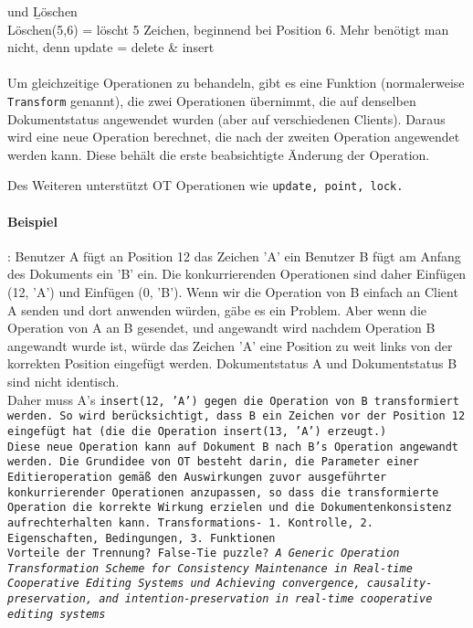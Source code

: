       und \b{Löschen}\\
      Löschen(5,6) = löscht 5 Zeichen, beginnend bei Position 6.
      Mehr benötigt man nicht, denn update = delete \& insert\\\\
      Um gleichzeitige Operationen zu behandeln, gibt es eine Funktion (normalerweise \texttt{Transform} genannt), die zwei Operationen übernimmt, die auf denselben Dokumentstatus angewendet wurden (aber auf verschiedenen Clients).
      Daraus wird eine neue Operation berechnet, die nach der zweiten Operation angewendet werden kann. Diese behält die erste beabsichtigte Änderung der Operation.

      Des Weiteren unterstützt \gls{OT} Operationen wie \tt{update}, \tt{point}, \tt{lock}.
      \paragraph{Beispiel}:
      Benutzer A fügt an Position 12 das Zeichen 'A' ein
      Benutzer B fügt am Anfang des Dokuments ein 'B' ein.
      Die konkurrierenden Operationen sind daher Einfügen (12, 'A') und Einfügen (0, 'B').
      Wenn wir die Operation von B einfach an Client A senden und dort anwenden würden, gäbe es ein Problem.
      Aber wenn die Operation von A an B gesendet, und angewandt wird nachdem Operation B angewandt wurde ist, würde das Zeichen 'A' eine Position zu weit links von der korrekten Position eingefügt werden.
      Dokumentstatus A und Dokumentstatus B sind nicht identisch.\\
      Daher muss A's \tt{insert(12, 'A')} gegen die Operation von B transformiert werden. So wird berücksichtigt, dass B ein Zeichen vor der Position 12 eingefügt hat (die die Operation \tt{insert(13, 'A')} erzeugt.)\\
      Diese neue Operation kann auf Dokument B nach B's Operation angewandt werden.
      Die Grundidee von \gls{OT} besteht darin, die Parameter einer Editieroperation gemäß den Auswirkungen \b{zuvor ausgeführter} konkurrierender Operationen anzupassen, so dass die transformierte Operation die korrekte Wirkung erzielen und die Dokumentenkonsistenz aufrechterhalten kann.
      Transformations- 1. Kontrolle, 2. Eigenschaften, Bedingungen, 3. Funktionen\\
      Vorteile der Trennung?
      False-Tie puzzle? \it{A Generic Operation Transformation Scheme for Consistency Maintenance in Real-time Cooperative Editing Systems} und \it{Achieving convergence, causality-preservation, and intention-preservation in real-time cooperative editing systems}\\\\
